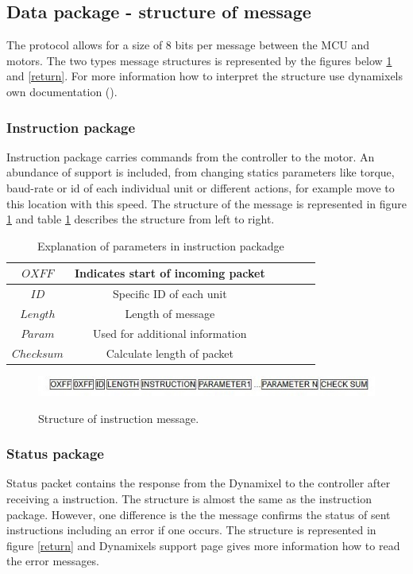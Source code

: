 \subsection{Data package - structure of message}
The protocol allows for a size of 8 bits per message between the MCU and motors. 
The two types message structures is represented by the figures below \ref{instr} and \ref{return}.
For more information how to interpret the structure use dynamixels own documentation ().

\subsubsection{Instruction package}
Instruction package carries commands from the controller to the motor.
An abundance of support is included,
from changing statics parameters like torque, baud-rate or id of each individual unit or different actions,
for example move to this location with this speed.
The structure of the message is represented in figure \ref{instr} and table \ref{instr_table} describes the structure from left to right. 

\begin{table}[H]
    \centering
    \caption{Explanation of parameters in instruction packadge}
    \begin{tabular}{c | c c c c c}
        \(OXFF\) & Indicates start of incoming packet  \\
        \hline
        \(ID\) & Specific ID of each unit  \\
        \hline
        \(Length\) & Length of message \\
        \hline
        \(Param\) & Used for additional information  \\
        \hline
        \(Check sum\) & Calculate length of packet \\
        \hline
    \end{tabular}
    \label{instr_table}
\end{table}

\begin{figure}[H]
    \graphicspath{ {img/} }
    \centering
    
    \includegraphics[width = 9 cm]{img/instruction_packadge}
    \label{instr}
    \caption{Structure of instruction message.}
\end{figure}

\subsubsection{Status package}
Status packet contains the response from the Dynamixel to the controller after receiving a instruction.
The structure is almost the same as the instruction package.
However, one difference is the the message confirms the status of sent instructions including an error if one occurs.
The structure is represented in figure \ref{return} and Dynamixels support page \cite{protocol1} gives more information how to read the error messages.

